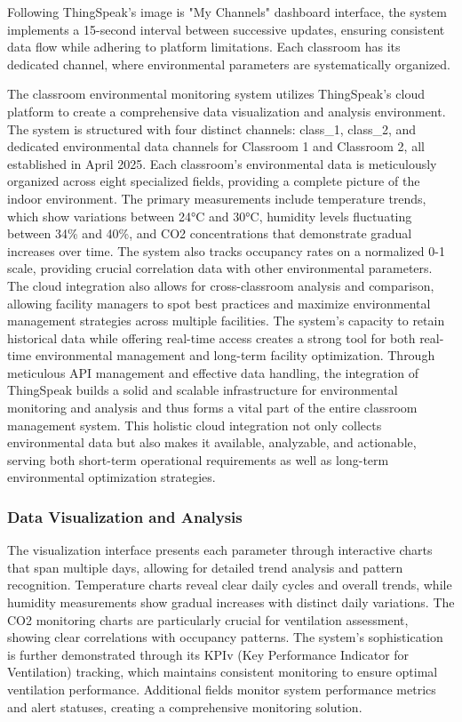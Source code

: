  Following ThingSpeak's image is "My Channels" dashboard interface, the system implements a 15-second interval between successive updates, ensuring consistent data flow while adhering to platform limitations. Each classroom has its dedicated channel, where environmental parameters are systematically organized.

The classroom environmental monitoring system utilizes ThingSpeak's cloud platform to create a comprehensive data visualization and analysis environment. The system is structured with four distinct channels: class\_1, class\_2, and dedicated environmental data channels for Classroom 1 and Classroom 2, all established in April 2025. Each classroom's environmental data is meticulously organized across eight specialized fields, providing a complete picture of the indoor environment. The primary measurements include temperature trends, which show variations between 24°C and 30°C, humidity levels fluctuating between 34\% and 40\%, and CO2 concentrations that demonstrate gradual increases over time. The system also tracks occupancy rates on a normalized 0-1 scale, providing crucial correlation data with other environmental parameters.
The cloud integration also allows for cross-classroom analysis and comparison, allowing facility managers to spot best practices and maximize environmental management strategies across multiple facilities. The system's capacity to retain historical data while offering real-time access creates a strong tool for both real-time environmental management and long-term facility optimization. Through meticulous API management and effective data handling, the integration of ThingSpeak builds a solid and scalable infrastructure for environmental monitoring and analysis and thus forms a vital part of the entire classroom management system.
This holistic cloud integration not only collects environmental data but also makes it available, analyzable, and actionable, serving both short-term operational requirements as well as long-term environmental optimization strategies.
\subsubsection{Data Visualization and Analysis}
The visualization interface presents each parameter through interactive charts that span multiple days, allowing for detailed trend analysis and pattern recognition. Temperature charts reveal clear daily cycles and overall trends, while humidity measurements show gradual increases with distinct daily variations. The CO2 monitoring charts are particularly crucial for ventilation assessment, showing clear correlations with occupancy patterns. The system's sophistication is further demonstrated through its KPIv (Key Performance Indicator for Ventilation) tracking, which maintains consistent monitoring to ensure optimal ventilation performance. Additional fields monitor system performance metrics and alert statuses, creating a comprehensive monitoring solution.

